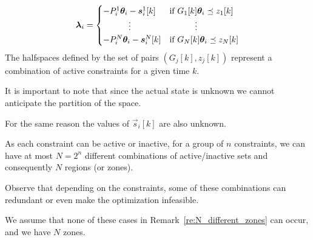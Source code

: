 \documentclass{ifacconf}  %
\begin{document}
\begin{equation}
  \begin{aligned}
    \label{eq:lambdafuntheta}
    \lambdai=
    \begin{cases}
      -P_{i}^{1}\vec{\theta}_{i}-\vec{s}_{i}^{1}[k]&\text{if}\ G_{1}[k]\thetai \preceq z_{1}[k] \\
      \qquad\quad \vdots&\qquad\quad \vdots\\
      -P_{i}^{N}\vec{\theta}_{i}-\vec{s}_{i}^{N}[k]&\text{if}\ G_{N}[k]\thetai \preceq z_{N}[k] \\
    \end{cases}
  \end{aligned}
\end{equation}
The halfspaces defined by the set of pairs $(G_{j}[k],z_{j}[k])$ represent a combination of active constraints for a given time $k$.

\begin{challenge}\label{ch:partition_unknown}
  It is important to note that since the actual state is unknown we cannot anticipate the partition of the space.
\end{challenge}
\begin{challenge}\label{ch:zone_unknown}
 For the same reason the values of $\vec{s}_{i}[k]$ are also unknown.
\end{challenge}

 As each constraint can be active or inactive, for a group of $n$ constraints, we can have at most $N=2^{n}$ different combinations of active/inactive sets and consequently $N$ regions (or zones).
 \begin{remark}\label{re:N_different_zones}
  Observe that depending on the constraints, some of these combinations can redundant or even make the optimization infeasible.
 \end{remark}
 \begin{assumption}
   We assume that none of these cases in Remark~\ref{re:N_different_zones} can occur, and we have $N$ zones.
 \end{assumption}

\end{document}

